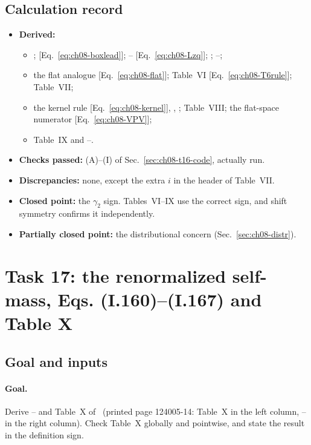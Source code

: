 \subsection{Calculation record}
\begin{itemize}[leftmargin=*,itemsep=2pt]
\item \textbf{Derived:}
\begin{itemize}[itemsep=0pt]
\item {};  [Eq.~\eqref{eq:ch08-boxlead}]; -- [Eq.~\eqref{eq:ch08-Lzq}]; ; --;
\item the flat analogue [Eq.~\eqref{eq:ch08-flat}]; Table~VI [Eq.~\eqref{eq:ch08-T6rule}]; Table~VII;
\item the kernel rule [Eq.~\eqref{eq:ch08-kernel}], , ; Table~VIII; the flat-space numerator [Eq.~\eqref{eq:ch08-VPV}];
\item Table~IX and --.
\end{itemize}
\item \textbf{Checks passed:} (A)--(I) of Sec.~\ref{sec:ch08-t16-code}, actually run.
\item \textbf{Discrepancies:} none, except the extra $i$ in the header of Table~VII.
\item \textbf{Closed point:} the $\gamma_2$ sign. Tables~VI--IX use the correct sign, and shift symmetry confirms it independently.
\item \textbf{Partially closed point:} the distributional concern (Sec.~\ref{sec:ch08-distr}).
\end{itemize}

\section{Task 17: the renormalized self-mass, Eqs. (I.160)--(I.167) and Table X}
\label{sec:ch08-t17}

\subsection{Goal and inputs}

\paragraph{Goal.} Derive -- and Table~X of \PI\ (printed page 124005-14: Table~X in the left column, -- in the right column).
Check Table~X globally and pointwise, and state the result in the definition sign.


